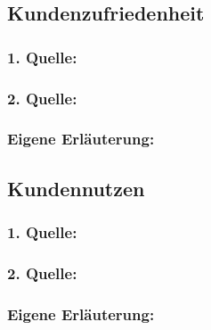     \subsection{Kundenzufriedenheit}
        \subsubsection*{1. Quelle:}
        \begin{abstract}
        \end{abstract}
        \subsubsection*{2. Quelle:}
        \begin{abstract}
        \end{abstract}
        \subsubsection*{Eigene Erläuterung:}
        \begin{abstract}
        \end{abstract}
    \subsection{Kundennutzen}
        \subsubsection*{1. Quelle:}
        \begin{abstract}
        \end{abstract}
        \subsubsection*{2. Quelle:}
        \begin{abstract}
        \end{abstract}
        \subsubsection*{Eigene Erläuterung:}
        \begin{abstract}
        \end{abstract}
